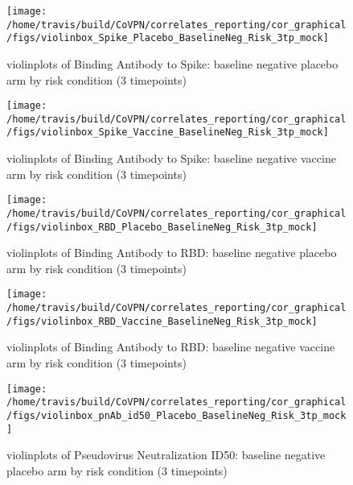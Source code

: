 \documentclass[]{book}
\theoremstyle{definition}
\theoremstyle{definition}
\theoremstyle{definition}
\newcommand{\1}{\mathbbm{1}}
\begin{document}
\clearpage
\begin{figure}[H]

{\centering \texttt{[image: /home/travis/build/CoVPN/correlates\_reporting/cor\_graphical/figs/violinbox\_Spike\_Placebo\_BaselineNeg\_Risk\_3tp\_mock]} 

}

\caption{violinplots of Binding Antibody to Spike: baseline negative placebo arm by risk condition (3 timepoints)}\label{fig:unnamed-chunk-115}
\end{figure}

\clearpage
\begin{figure}[H]

{\centering \texttt{[image: /home/travis/build/CoVPN/correlates\_reporting/cor\_graphical/figs/violinbox\_Spike\_Vaccine\_BaselineNeg\_Risk\_3tp\_mock]} 

}

\caption{violinplots of Binding Antibody to Spike: baseline negative vaccine arm by risk condition (3 timepoints)}\label{fig:unnamed-chunk-116}
\end{figure}

\clearpage
\begin{figure}[H]

{\centering \texttt{[image: /home/travis/build/CoVPN/correlates\_reporting/cor\_graphical/figs/violinbox\_RBD\_Placebo\_BaselineNeg\_Risk\_3tp\_mock]} 

}

\caption{violinplots of Binding Antibody to RBD: baseline negative placebo arm by risk condition (3 timepoints)}\label{fig:unnamed-chunk-117}
\end{figure}

\clearpage
\begin{figure}[H]

{\centering \texttt{[image: /home/travis/build/CoVPN/correlates\_reporting/cor\_graphical/figs/violinbox\_RBD\_Vaccine\_BaselineNeg\_Risk\_3tp\_mock]} 

}

\caption{violinplots of Binding Antibody to RBD: baseline negative vaccine arm by risk condition (3 timepoints)}\label{fig:unnamed-chunk-118}
\end{figure}

\clearpage
\begin{figure}[H]

{\centering \texttt{[image: /home/travis/build/CoVPN/correlates\_reporting/cor\_graphical/figs/violinbox\_pnAb\_id50\_Placebo\_BaselineNeg\_Risk\_3tp\_mock]} 

}

\caption{violinplots of Pseudovirus Neutralization ID50: baseline negative placebo arm by risk condition (3 timepoints)}\label{fig:unnamed-chunk-119}
\end{figure}
\end{document}
